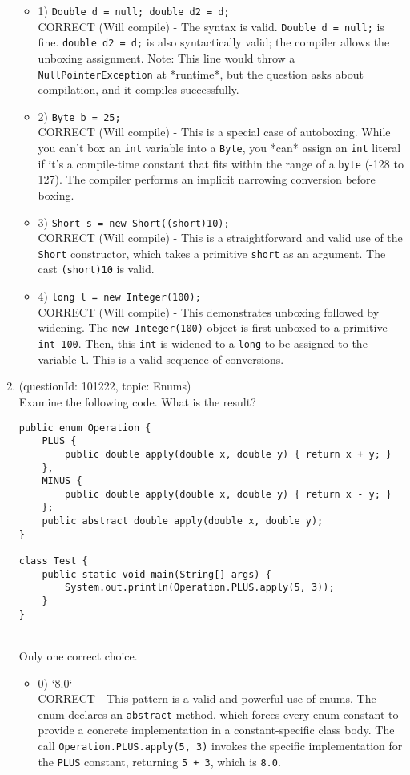 \documentclass[12pt]{article}
\begin{document}
\begin{enumerate}[label=(\arabic*)]
\begin{itemize}
\item 1) \verb|Double d = null; double d2 = d;|
 \\ 
CORRECT (Will compile) - The syntax is valid. \verb|Double d = null;| is fine. \verb|double d2 = d;| is also syntactically valid; the compiler allows the unboxing assignment. Note: This line would throw a \verb|NullPointerException| at *runtime*, but the question asks about compilation, and it compiles successfully.

\item 2) \verb|Byte b = 25; |
 \\ 
CORRECT (Will compile) - This is a special case of autoboxing. While you can't box an \verb|int| variable into a \verb|Byte|, you *can* assign an \verb|int| literal if it's a compile-time constant that fits within the range of a \verb|byte| (-128 to 127). The compiler performs an implicit narrowing conversion before boxing.

\item 3) \verb|Short s = new Short((short)10);|
 \\ 
CORRECT (Will compile) - This is a straightforward and valid use of the \verb|Short| constructor, which takes a primitive \verb|short| as an argument. The cast \verb|(short)10| is valid.

\item 4) \verb|long l = new Integer(100);|
 \\ 
CORRECT (Will compile) - This demonstrates unboxing followed by widening. The \verb|new Integer(100)| object is first unboxed to a primitive \verb|int 100|. Then, this \verb|int| is widened to a \verb|long| to be assigned to the variable \verb|l|. This is a valid sequence of conversions.

\end{itemize}
\item (questionId: 101222, topic: Enums) \\ 
Examine the following code. What is the result?
\begin{verbatim}
public enum Operation {
    PLUS {
        public double apply(double x, double y) { return x + y; }
    },
    MINUS {
        public double apply(double x, double y) { return x - y; }
    };
    public abstract double apply(double x, double y);
}

class Test {
    public static void main(String[] args) {
        System.out.println(Operation.PLUS.apply(5, 3));
    }
}
\end{verbatim}
\\ \noindent Only one correct choice. 
\begin{itemize}
\item 0) `8.0`
 \\ 
CORRECT - This pattern is a valid and powerful use of enums. The enum declares an \verb|abstract| method, which forces every enum constant to provide a concrete implementation in a constant-specific class body. The call \verb|Operation.PLUS.apply(5, 3)| invokes the specific implementation for the \verb|PLUS| constant, returning \verb|5 + 3|, which is \verb|8.0|.


\end{itemize}
\end{enumerate}
\end{document}
